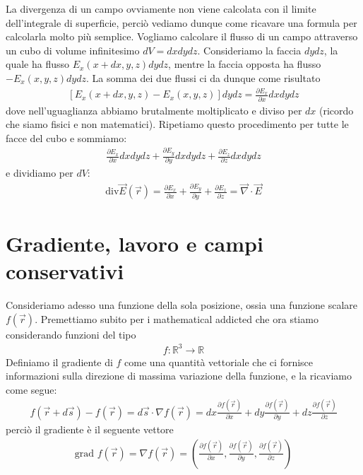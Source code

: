 \documentclass{book}
\begin{document}
\noindent La divergenza di un campo ovviamente non viene calcolata con il limite dell'integrale di superficie, perciò vediamo dunque come ricavare una formula per calcolarla molto più semplice.
Vogliamo calcolare il flusso di un campo attraverso un cubo di volume infinitesimo $dV =dxdydz$.
Consideriamo la faccia $dydz$, la quale ha flusso $E_x(x+dx, y, z) dydz$, mentre la faccia opposta ha flusso $- E_x (x, y,z) dydz$. La somma dei due flussi ci da dunque come risultato 
\begin{align*}
    \left[ E_x(x+dx, y, z)- E_x(x,y,z)\right]dydz = \frac{\partial E_x}{\partial x} dx dy dz
\end{align*}
dove nell'uguaglianza abbiamo brutalmente moltiplicato e diviso per $dx$ (ricordo che siamo fisici e non matematici).
Ripetiamo questo procedimento per tutte le facce del cubo e sommiamo:
\begin{align*}
    \frac{\partial E_x}{\partial x}dxdydz+ \frac{\partial E_y}{\partial y}dxdydz + \frac{\partial E_z}{\partial z}dxdydz
\end{align*}
e dividiamo per $dV$:
\begin{align*}
\text{div} \vec{E}(\vec{r})= \frac{\partial E_x}{\partial x} + \frac{\partial E_y }{\partial y} + \frac{\partial E_z}{\partial z} = \vec{\nabla} \cdot \vec{E}
\end{align*}

\section{Gradiente, lavoro e campi conservativi}
Consideriamo adesso una funzione della sola posizione, ossia una funzione scalare $f(\vec{r})$. Premettiamo subito per i mathematical addicted che ora stiamo considerando funzioni del tipo 
\begin{align*}
    f: \mathbb{R}^3\to \mathbb{R}
\end{align*}
Definiamo il gradiente di $f$ come una quantità vettoriale che ci fornisce informazioni sulla direzione di massima variazione della funzione, e la ricaviamo come segue:
\begin{align*}
    f(\vec{r}+ d\vec{s}) - f(\vec{r}) = d\vec{s} \cdot \nabla f (\vec{r}) = dx \frac{\partial f(\vec{r})}{\partial x}+ dy\frac{\partial f(\vec{r})}{\partial y}+ dz \frac{\partial f(\vec{r})}{\partial z}
\end{align*}
perciò il gradiente è il seguente vettore 
\begin{align*}
    \text{grad }f(\vec{r}) = \nabla f(\vec{r}) = \left(\frac{\partial f(\vec{r})}{\partial x}, \frac{\partial f(\vec{r})}{\partial y}, \frac{\partial f(\vec{r})}{\partial z}\right)
\end{align*}
\end{document}

